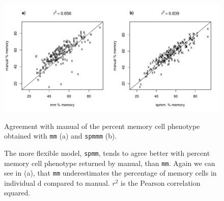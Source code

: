 \begin{figure}
\centering
\begin{minipage}{.7\textwidth}
\includegraphics[width=\linewidth]{figures/memory-auto-manual-agreement-weights.pdf}
\end{minipage}
{Agreement with manual of the percent memory cell phenotype obtained with \texttt{mm} (a) and \texttt{spmmm} (b).}
{
  The more flexible model, \texttt{spmm}, tends to agree better with percent memory cell phenotype returned by manual, than \texttt{mm}.
  Again we can see in (a), that \texttt{mm} underestimates the percentage of memory cells in individual d compared to
  manual.  $r^2$ is the Pearson correlation squared.

}
\end{figure}
